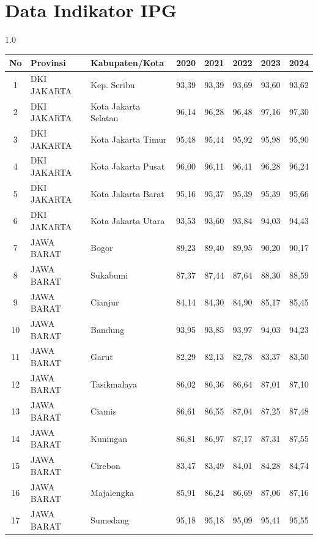 \section*{Data Indikator IPG}
\begin{spacing}{1.0}
\scriptsize
\setlength{\tabcolsep}{2pt}
\begin{longtable}{|c|p{2.2cm}|p{2.8cm}|c|c|c|c|c|}
\hline
\textbf{No} & \textbf{Provinsi} & \textbf{Kabupaten/Kota} & \textbf{2020} & \textbf{2021} & \textbf{2022} & \textbf{2023} & \textbf{2024} \\ \hline
\endhead
1 & DKI JAKARTA & Kep. Seribu & 93,39 & 93,39 & 93,69 & 93,60 & 93,62 \\ \hline
2 & DKI JAKARTA & Kota Jakarta Selatan & 96,14 & 96,28 & 96,48 & 97,16 & 97,30 \\ \hline
3 & DKI JAKARTA & Kota Jakarta Timur & 95,48 & 95,44 & 95,92 & 95,98 & 95,90 \\ \hline
4 & DKI JAKARTA & Kota Jakarta Pusat & 96,00 & 96,11 & 96,41 & 96,28 & 96,24 \\ \hline
5 & DKI JAKARTA & Kota Jakarta Barat & 95,16 & 95,37 & 95,39 & 95,39 & 95,66 \\ \hline
6 & DKI JAKARTA & Kota Jakarta Utara & 93,53 & 93,60 & 93,84 & 94,03 & 94,43 \\ \hline
7 & JAWA BARAT & Bogor & 89,23 & 89,40 & 89,95 & 90,20 & 90,17 \\ \hline
8 & JAWA BARAT & Sukabumi & 87,37 & 87,44 & 87,64 & 88,30 & 88,59 \\ \hline
9 & JAWA BARAT & Cianjur & 84,14 & 84,30 & 84,90 & 85,17 & 85,45 \\ \hline
10 & JAWA BARAT & Bandung & 93,95 & 93,85 & 93,97 & 94,03 & 94,23 \\ \hline
11 & JAWA BARAT & Garut & 82,29 & 82,13 & 82,78 & 83,37 & 83,50 \\ \hline
12 & JAWA BARAT & Tasikmalaya & 86,02 & 86,36 & 86,64 & 87,01 & 87,10 \\ \hline
13 & JAWA BARAT & Ciamis & 86,61 & 86,55 & 87,04 & 87,25 & 87,48 \\ \hline
14 & JAWA BARAT & Kuningan & 86,81 & 86,97 & 87,17 & 87,31 & 87,55 \\ \hline
15 & JAWA BARAT & Cirebon & 83,47 & 83,49 & 84,01 & 84,28 & 84,74 \\ \hline
16 & JAWA BARAT & Majalengka & 85,91 & 86,24 & 86,69 & 87,06 & 87,16 \\ \hline
17 & JAWA BARAT & Sumedang & 95,18 & 95,18 & 95,09 & 95,41 & 95,55 \\ \hline

\end{longtable}
\end{spacing}
